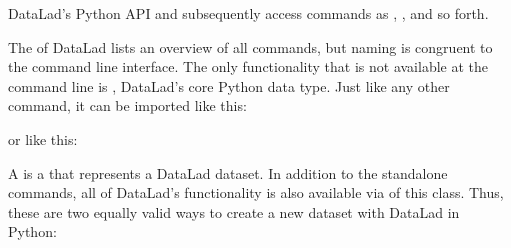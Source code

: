 \begin{findoutmore}[label={fom-pythonapi}, before title={\thetcbcounter\ }, float, check odd page=true]{DataLad’s Python API}
\sphinxAtStartPar
and subsequently access commands as , , and so forth.

\sphinxAtStartPar
The 
of DataLad lists an overview of all commands, but naming is congruent to the
command line interface. The only functionality that is not available at the
command line is , DataLad’s core Python data type.
Just like any other command, it can be imported like this:

\begin{sphinxVerbatim}[commandchars=\\\{\}]
   
\end{sphinxVerbatim}

\sphinxAtStartPar
or like this:

\begin{sphinxVerbatim}[commandchars=\\\{\}]
   
\end{sphinxVerbatim}

\sphinxAtStartPar
A  is a 
that represents a DataLad dataset. In addition to the
stand\sphinxhyphen{}alone commands, all of DataLad’s functionality is also available via
of this class. Thus, these are two equally valid ways to create a new
dataset with DataLad in Python:

\begin{sphinxVerbatim}[commandchars=\\\{\}]
    
  
\end{sphinxVerbatim}


\end{findoutmore}

